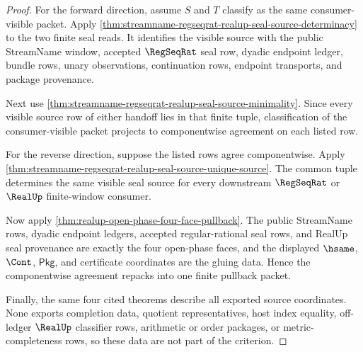 \begin{proof}
For the forward direction, assume $S$ and $T$ classify as the same
consumer-visible packet. Apply
\autoref{thm:streamname-regseqrat-realup-seal-source-determinacy} to the two
finite seal reads. It identifies the visible source with the public
StreamName window, accepted $\RegSeqRat$ seal row, dyadic endpoint ledger,
bundle rows, unary observations, continuation rows, endpoint transports, and
package provenance.

Next use \autoref{thm:streamname-regseqrat-realup-seal-source-minimality}.
Since every visible source row of either handoff lies in that finite tuple,
classification of the consumer-visible packet projects to componentwise
agreement on each listed row.

For the reverse direction, suppose the listed rows agree componentwise. Apply
\autoref{thm:streamname-regseqrat-realup-seal-source-unique-source}. The common
tuple determines the same visible seal source for every downstream
$\RegSeqRat$ or $\RealUp$ finite-window consumer.

Now apply \autoref{thm:realup-open-phase-four-face-pullback}. The public
StreamName rows, dyadic endpoint ledgers, accepted regular-rational seal rows,
and RealUp seal provenance are exactly the four open-phase faces, and the
displayed $\hsame$, $\Cont$, $\mathsf{Pkg}$, and certificate coordinates are
the gluing data. Hence the componentwise agreement repacks into one finite
pullback packet.

Finally, the same four cited theorems describe all exported source
coordinates. None exports completion data, quotient representatives, host
index equality, off-ledger $\RealUp$ classifier rows, arithmetic or order
packages, or metric-completeness rows, so these data are not part of the
criterion.
\end{proof}

